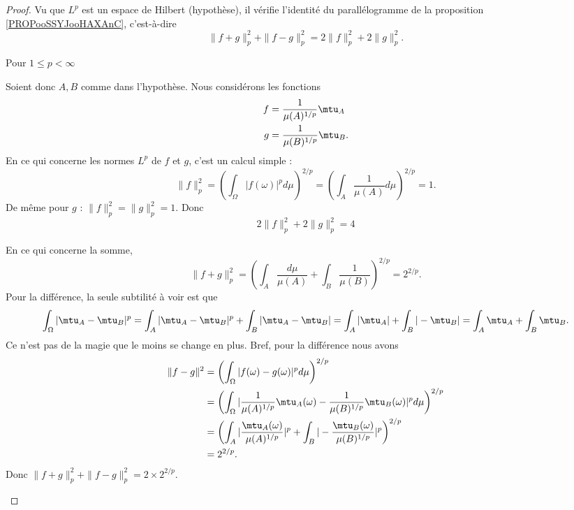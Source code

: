 \begin{proof}
    Vu que \( L^p\) est un espace de Hilbert (hypothèse), il vérifie l'identité du parallélogramme de la proposition \ref{PROPooSSYJooHAXAnC}, c'est-à-dire
    \begin{equation}        \label{EQooAKKYooURIbvi}
        \| f+g \|^2_p+\| f-g \|^2_p=2\| f \|_p^2+2\| g \|^2_p.
    \end{equation}

    \begin{subproof}
    \item[Pour \( 1\leq p<\infty\)]
        

    Soient donc \( A,B\) comme dans l'hypothèse. Nous considérons les fonctions
    \begin{subequations}
        \begin{align}
            f&=\frac{1}{ \mu(A)^{1/p} }\mtu_A\\
            g&=\frac{1}{ \mu(B)^{1/p} }\mtu_B.
        \end{align}
    \end{subequations}
    En ce qui concerne les normes \( L^p\) de \( f\) et \( g\), c'est un calcul simple :
    \begin{equation}
        \| f \|_p^2=\left( \int_{\Omega}| f(\omega) |^pd\mu \right)^{2/p}=\left( \int_A\frac{1}{ \mu(A) }d\mu \right)^{2/p}=1.
    \end{equation}
    De même pour \( g\) : \( \| f \|_p^2=\| g \|_p^2=1\). Donc
    \begin{equation}
        2\| f \|_p^2+2\| g \|_p^2=4
    \end{equation}

    En ce qui concerne la somme,
    \begin{equation}
        \| f+g \|_p^2=\left( \int_A\frac{ d\mu }{ \mu(A) }+\int_B\frac{1}{ \mu(B) } \right)^{2/p}=2^{2/p}.
    \end{equation}
    Pour la différence, la seule subtilité à voir est que
    \begin{equation}
        \int_{\Omega}| \mtu_A-\mtu_B |^p=\int_A| \mtu_A-\mtu_B |^p+\int_B| \mtu_A-\mtu_B |=\int_A| \mtu_A |+\int_B| -\mtu_B |=\int_A\mtu_A+\int_B\mtu_B.
    \end{equation}
    Ce n'est pas de la magie que le moins se change en plus. Bref, pour la différence nous avons
    \begin{subequations}
        \begin{align}
            \| f-g \|^2&=\left( \int_{\Omega}| f(\omega)-g(\omega) |^pd\mu \right)^{2/p}\\
            &=\left( \int_{\Omega}| \frac{1}{ \mu(A)^{1/p} }\mtu_A(\omega)-\frac{1}{ \mu(B)^{1/p} }\mtu_B(\omega) |^pd\mu \right)^{2/p}\\
            &=\left( \int_A| \frac{ \mtu_A(\omega) }{ \mu(A)^{1/p} } |^p   +\int_B| -\frac{ \mtu_B(\omega) }{ \mu(B)^{1/p} } |^p    \right)^{2/p}\\
            &=2^{2/p}.
        \end{align}
    \end{subequations}
    Donc \( \| f+g \|^{2}_p+\| f-g \|_p^2=2\times 2^{2/p}\).


\end{subproof}
\end{proof}
